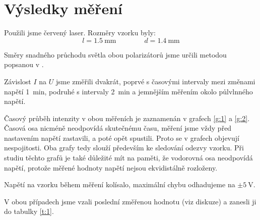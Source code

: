 \section*{Výsledky měření}
Použili jsme červený laser.
Rozměry vzorku byly:
\begin{equation*}
l=\SI{1.5}{\mm} \qquad \qquad d=\SI{1.4}{\mm}
\end{equation*}

Směry snadného průchodu světla obou polarizátorů jsme určili metodou popsanou v \cite{zfp}.

Závislost $I$ na $U$ jsme změřili dvakrát, poprvé s časovými intervaly mezi změnami napětí \SI{1}{\minute}, podruhé s intervaly \SI{2}{\minute} a jemnějším měřením okolo půlvlnného napětí.

Časový průběh intenzity v obou měřeních je zaznamenán v grafech \ref{g:1} a \ref{g:2}. Časová osa nicméně neodpovídá skutečnému času, měření jsme vždy před nastavením napětí zastavili, a poté opět spustili. Proto se v grafech objevují nespojitosti. Oba grafy tedy slouží především ke sledování odezvy vzorku. Při studiu těchto grafů je také důležité mít na paměti, že vodorovná osa neodpovídá napětí, protože měřené hodnoty napětí nejsou ekvidistálně rozloženy.

\begin{graph}[htbp] 
\centering

\caption{První měření (interval \SI{1}{\minute})}
\label{g:1}
\end{graph}

\begin{graph}[htbp] 
\centering

\caption{Druhé měření (interval \SI{2}{\minute})}
\label{g:2}
\end{graph}

Napětí na vzorku během měření kolísalo, maximální chybu odhadujeme na $\pm\SI{5}{\volt}$.

V obou případech jsme vzali poslední změřenou hodnotu (viz diskuze) a zanesli ji do tabulky \ref{t:1}.

